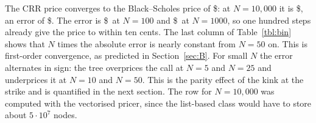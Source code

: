 The CRR price converges to the Black--Scholes price of \$\BSprice: at $N=10{,}000$ it is \$\CRRtenk, an error of \$\CRRtenkErr.
The error is \$\CRRhundredErr\ at $N=100$ and \$\CRRthousandErr\ at $N=1000$, so one hundred steps already give the price to within ten cents.
The last column of Table~\ref{tbl:bin} shows that $N$ times the absolute error is nearly constant from $N=50$ on.
This is first-order convergence, as predicted in Section~\ref{sec:B}.
For small $N$ the error alternates in sign: the tree overprices the call at $N=5$ and $N=25$ and underprices it at $N=10$ and $N=50$.
This is the parity effect of the kink at the strike and is quantified in the next section.
The row for $N=10{,}000$ was computed with the vectorised pricer, since the list-based class would have to store about $5\cdot10^{7}$ nodes.
